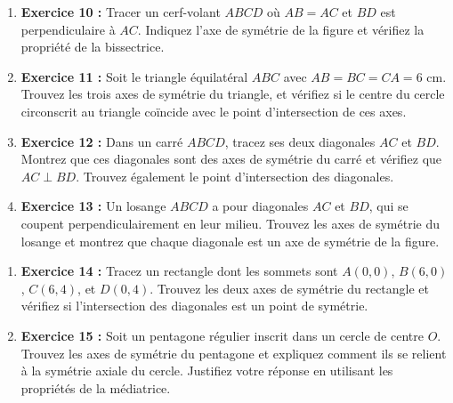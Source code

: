 \documentclass{article}
\begin{document}
\begin{tcolorbox}[colback=yellow!10!white, colframe=yellow!75!black, title=\textcolor{white}{Exercices}, sharp corners=south]
\begin{enumerate}
        \item \textbf{Exercice 10 :} Tracer un cerf-volant \( ABCD \) où \( AB = AC \) et \( BD \) est perpendiculaire à \( AC \). Indiquez l'axe de symétrie de la figure et vérifiez la propriété de la bissectrice.
        
        \item \textbf{Exercice 11 :} Soit le triangle équilatéral \( ABC \) avec \( AB = BC = CA = 6 \) cm. Trouvez les trois axes de symétrie du triangle, et vérifiez si le centre du cercle circonscrit au triangle coïncide avec le point d'intersection de ces axes.

        \item \textbf{Exercice 12 :} Dans un carré \( ABCD \), tracez ses deux diagonales \( AC \) et \( BD \). Montrez que ces diagonales sont des axes de symétrie du carré et vérifiez que \( AC \perp BD \). Trouvez également le point d'intersection des diagonales.

        \item \textbf{Exercice 13 :} Un losange \( ABCD \) a pour diagonales \( AC \) et \( BD \), qui se coupent perpendiculairement en leur milieu. Trouvez les axes de symétrie du losange et montrez que chaque diagonale est un axe de symétrie de la figure.
    \end{enumerate}
\end{tcolorbox}

\begin{tcolorbox}[colback=yellow!10!white, colframe=brown!75!black, title=\textcolor{white}{Pour allez plus loin}, sharp corners=south]

    \begin{enumerate}
        \item \textbf{Exercice 14 :} Tracez un rectangle dont les sommets sont \( A(0, 0) \), \( B(6, 0) \), \( C(6, 4) \), et \( D(0, 4) \). Trouvez les deux axes de symétrie du rectangle et vérifiez si l'intersection des diagonales est un point de symétrie.

        \item \textbf{Exercice 15 :} Soit un pentagone régulier inscrit dans un cercle de centre \( O \). Trouvez les axes de symétrie du pentagone et expliquez comment ils se relient à la symétrie axiale du cercle. Justifiez votre réponse en utilisant les propriétés de la médiatrice.
    \end{enumerate}
\end{tcolorbox}
\end{document}
